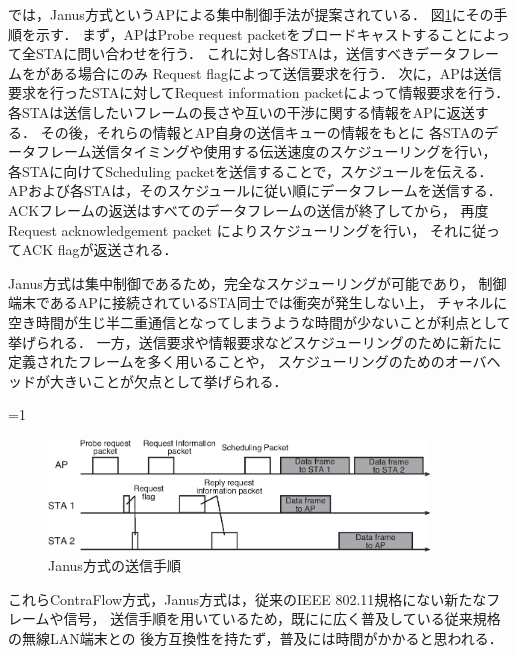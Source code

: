 \documentclass[master]{kuisthesis}		%
\newcounter{flagFig}
\begin{document}
			\par
			\cite{janus}では，Janus方式というAPによる集中制御手法が提案されている．
			図\ref{fig:janus}にその手順を示す．
			まず，APはProbe request packetをブロードキャストすることによって全STAに問い合わせを行う．
			これに対し各STAは，送信すべきデータフレームをがある場合にのみ
			Request flagによって送信要求を行う．
			次に，APは送信要求を行ったSTAに対してRequest information packetによって情報要求を行う．
			各STAは送信したいフレームの長さや互いの干渉に関する情報をAPに返送する．
			その後，それらの情報とAP自身の送信キューの情報をもとに
			各STAのデータフレーム送信タイミングや使用する伝送速度のスケジューリングを行い，
			各STAに向けてScheduling packetを送信することで，スケジュールを伝える．
			APおよび各STAは，そのスケジュールに従い順にデータフレームを送信する．
			ACKフレームの返送はすべてのデータフレームの送信が終了してから，
			再度Request acknowledgement packet によりスケジューリングを行い，
			それに従ってACK flagが返送される．
			\par
			Janus方式は集中制御であるため，完全なスケジューリングが可能であり，
			制御端末であるAPに接続されているSTA同士では衝突が発生しない上，
			チャネルに空き時間が生じ半二重通信となってしまうような時間が少ないことが利点として挙げられる．
			一方，送信要求や情報要求などスケジューリングのために新たに定義されたフレームを多く用いることや，
			スケジューリングのためのオーバヘッドが大きいことが欠点として挙げられる．

			\ifnum\value{flagFig}=1 {\begin{figure}[t]
				\begin{center}
					\includegraphics[width=0.9\textwidth]{fig/janus.eps}
					\caption{Janus方式の送信手順}
					\label{fig:janus}
				\end{center}
			\end{figure}}\fi

			\par
			これらContraFlow方式，Janus方式は，従来のIEEE 802.11規格にない新たなフレームや信号，
			送信手順を用いているため，既にに広く普及している従来規格の無線LAN端末との
			後方互換性を持たず，普及には時間がかかると思われる．
\end{document}

